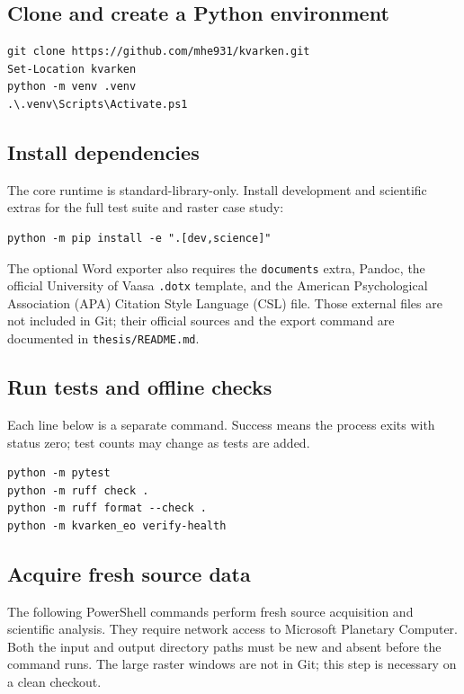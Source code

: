 \subsection{Clone and create a Python environment}

\begin{verbatim}
git clone https://github.com/mhe931/kvarken.git
Set-Location kvarken
python -m venv .venv
.\.venv\Scripts\Activate.ps1
\end{verbatim}

\subsection{Install dependencies}

The core runtime is standard-library-only. Install development and scientific extras for the
full test suite and raster case study:

\begin{verbatim}
python -m pip install -e ".[dev,science]"
\end{verbatim}

The optional Word exporter also requires the \texttt{documents} extra, Pandoc, the official
University of Vaasa \texttt{.dotx} template, and the American Psychological Association (APA) Citation
Style Language (CSL) file. Those external files are not included
in Git; their official sources and the export command are documented in
\texttt{thesis/README.md}.

\subsection{Run tests and offline checks}

Each line below is a separate command. Success means the process exits with status zero; test
counts may change as tests are added.

\begin{verbatim}
python -m pytest
python -m ruff check .
python -m ruff format --check .
python -m kvarken_eo verify-health
\end{verbatim}

\subsection{Acquire fresh source data}

The following PowerShell commands perform fresh source acquisition and scientific analysis.
They require network access to Microsoft Planetary Computer. Both the input and output directory paths must
be new and absent before the command runs. The large raster windows are not in Git; this step
is necessary on a clean checkout.

